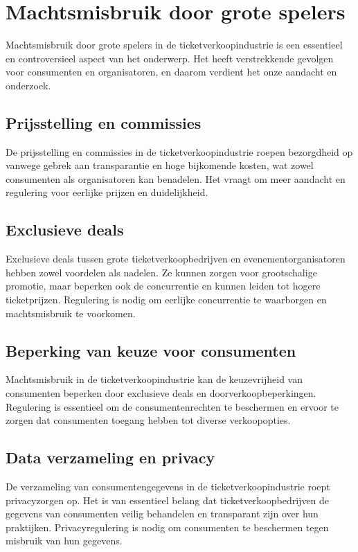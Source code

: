 
\section{Machtsmisbruik door grote spelers}
Machtsmisbruik door grote spelers in de ticketverkoopindustrie is een essentieel en controversieel aspect van het onderwerp. 
Het heeft verstrekkende gevolgen voor consumenten en organisatoren, en daarom verdient het onze aandacht en onderzoek.

\subsection{Prijsstelling en commissies}
De prijsstelling en commissies in de ticketverkoopindustrie roepen bezorgdheid op vanwege gebrek aan transparantie en hoge bijkomende kosten, wat zowel consumenten als organisatoren kan benadelen. 
Het vraagt om meer aandacht en regulering voor eerlijke prijzen en duidelijkheid.

\subsection{Exclusieve deals}
Exclusieve deals tussen grote ticketverkoopbedrijven en evenementorganisatoren hebben zowel voordelen als nadelen. 
Ze kunnen zorgen voor grootschalige promotie, maar beperken ook de concurrentie en kunnen leiden tot hogere ticketprijzen. 
Regulering is nodig om eerlijke concurrentie te waarborgen en machtsmisbruik te voorkomen.

\subsection{Beperking van keuze voor consumenten}
Machtsmisbruik in de ticketverkoopindustrie kan de keuzevrijheid van consumenten beperken door exclusieve deals en doorverkoopbeperkingen. 
Regulering is essentieel om de consumentenrechten te beschermen en ervoor te zorgen dat consumenten toegang hebben tot diverse verkoopopties.

\subsection{Data verzameling en privacy}
De verzameling van consumentengegevens in de ticketverkoopindustrie roept privacyzorgen op. 
Het is van essentieel belang dat ticketverkoopbedrijven de gegevens van consumenten veilig behandelen en transparant zijn over hun praktijken. 
Privacyregulering is nodig om consumenten te beschermen tegen misbruik van hun gegevens.

